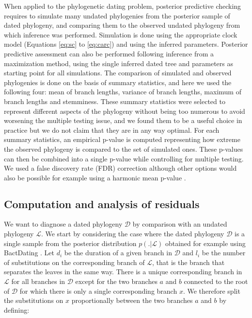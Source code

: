 \documentclass{article}
\begin{document}
When applied to the phylogenetic dating problem, posterior predictive checking requires
to simulate many undated phylogenies from the posterior sample of dated phylogeny,
and comparing them to the observed undated phylogeny from which inference was performed.
Simulation is done using the appropriate clock model (Equations \ref{eq:sc} to \ref{eq:carc})
and using the inferred parameters. Posterior predictive assessment can also be performed
following inference from a maximization method, using the single inferred dated tree and parameters as 
starting point for all simulations. 
The comparison of simulated and observed phylogenies is done on the basis of summary statistics, and
here we used the following four: mean of branch lengths, variance of branch lengths,
maximum of branch lengths and stemminess. 
These summary statistics were selected to represent different aspects of the phylogeny without
being too numerous to avoid worsening the multiple testing issue, and we found them to be a useful
choice in practice but we do not claim that they are in any way optimal.
For each summary statistics, an empirical p-value is computed representing how extreme the 
observed phylogeny is compared to the set of simulated ones. 
These p-values can then be combined into a single p-value while controlling for multiple testing.
We used a false discovery rate (FDR) correction \citep{Benjamini1995} although other options would also be 
possible for example using a harmonic mean p-value \citep{wilsonHarmonicMeanPvalue2019}.

\subsection*{Computation and analysis of residuals}

We want to diagnose a dated phylogeny $\mathcal{D}$ by comparison with an undated phylogeny $\mathcal{L}$. We start by considering the case where the dated phylogeny $\mathcal{D}$ is a single sample from the posterior distribution $p(.|\mathcal{L})$ obtained for example using BactDating \citep{Didelot2018}.
Let $d_i$ be the duration of a given branch in $\mathcal{D}$ and $l_i$ be the number of substitutions on the corresponding branch of $\mathcal{L}$, that is the branch that separates the leaves in the same way. There is a unique corresponding branch in $\mathcal{L}$ for all branches in $\mathcal{D}$ except for the two branches $a$ and $b$ connected to the root of $\mathcal{D}$ for which there is only a single corresponding branch $x$. We therefore split the substitutions on $x$ proportionally between the two branches $a$ and $b$ by defining:
\end{document}
